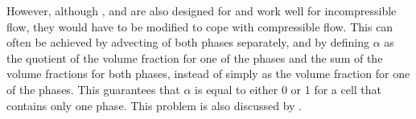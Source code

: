 However, although \CICSAM, \STACS and \MULES are also designed for and work well for incompressible flow, they would have to be modified to cope with compressible flow. This can often be achieved by advecting  of both phases separately, and by defining $\alpha$ as the quotient of the volume fraction for one of the phases and the sum of the volume fractions for both phases, instead of simply as the volume fraction for one of the phases. This guarantees that $\alpha$ is equal to either 0 or 1 for a cell that contains only one phase. This problem is also discussed by \citet{Heyns2011}.









